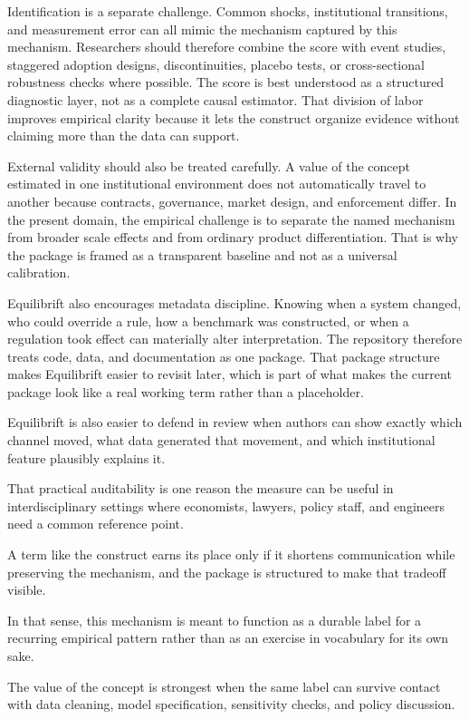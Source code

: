 \documentclass[12pt]{article}
\begin{document}
Identification is a separate challenge. Common shocks, institutional transitions, and measurement error can all mimic the mechanism captured by this mechanism. Researchers should therefore combine the score with event studies, staggered adoption designs, discontinuities, placebo tests, or cross-sectional robustness checks where possible. The score is best understood as a structured diagnostic layer, not as a complete causal estimator. That division of labor improves empirical clarity because it lets the construct organize evidence without claiming more than the data can support.

External validity should also be treated carefully. A value of the concept estimated in one institutional environment does not automatically travel to another because contracts, governance, market design, and enforcement differ. In the present domain, the empirical challenge is to separate the named mechanism from broader scale effects and from ordinary product differentiation. That is why the package is framed as a transparent baseline and not as a universal calibration.

Equilibrift also encourages metadata discipline. Knowing when a system changed, who could override a rule, how a benchmark was constructed, or when a regulation took effect can materially alter interpretation. The repository therefore treats code, data, and documentation as one package. That package structure makes Equilibrift easier to revisit later, which is part of what makes the current package look like a real working term rather than a placeholder.

Equilibrift is also easier to defend in review when authors can show exactly which channel moved, what data generated that movement, and which institutional feature plausibly explains it.

That practical auditability is one reason the measure can be useful in interdisciplinary settings where economists, lawyers, policy staff, and engineers need a common reference point.

A term like the construct earns its place only if it shortens communication while preserving the mechanism, and the package is structured to make that tradeoff visible.

In that sense, this mechanism is meant to function as a durable label for a recurring empirical pattern rather than as an exercise in vocabulary for its own sake.

The value of the concept is strongest when the same label can survive contact with data cleaning, model specification, sensitivity checks, and policy discussion.
\end{document}
